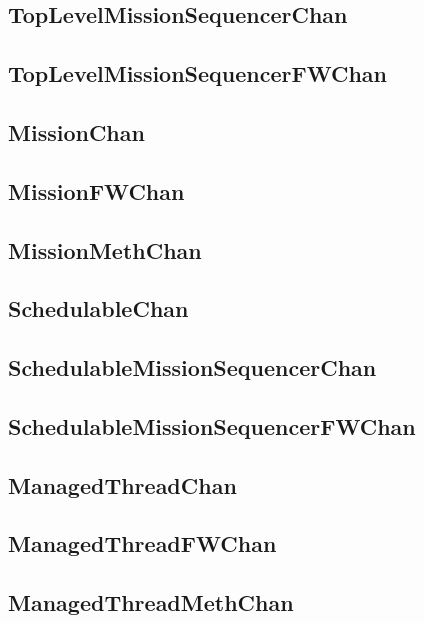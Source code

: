 \documentclass{article}
\begin{document}
\begin{plumbing}
\subsection{TopLevelMissionSequencerChan}


\subsection{TopLevelMissionSequencerFWChan}


\subsection{MissionChan}


\subsection{MissionFWChan}


\subsection{MissionMethChan}


\subsection{SchedulableChan}


\subsection{SchedulableMissionSequencerChan}


\subsection{SchedulableMissionSequencerFWChan}


\subsection{ManagedThreadChan}


\subsection{ManagedThreadFWChan}


\subsection{ManagedThreadMethChan}

\newpage
\end{plumbing}
\end{document}
